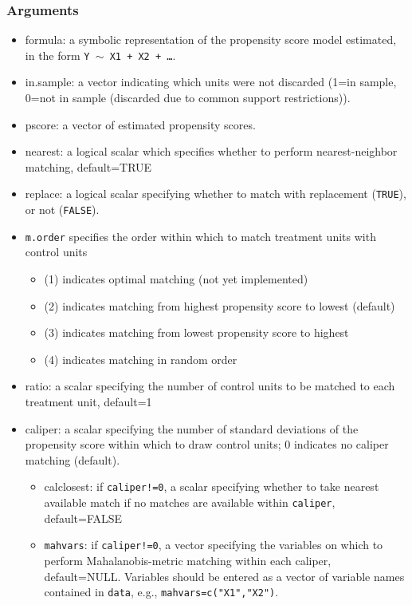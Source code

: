 \documentclass[oneside,letterpaper,titlepage]{article}
\begin{document}
\begin{appendix}
\subsubsection{Arguments}
\begin{itemize}
\item{formula}:  a symbolic representation of the propensity score model estimated, in the form {\tt Y $\sim$ X1 + X2 + \dots}.
\item{in.sample}: a vector indicating which units were not discarded (1=in sample, 0=not in sample (discarded due to common support restrictions)). 
\item{pscore}: a vector of estimated propensity scores. 
\item{nearest}: a logical scalar which specifies whether
  to perform nearest-neighbor matching, default=TRUE 
\item{replace}: a logical scalar specifying whether to match with
  replacement (\texttt{TRUE}), or not (\texttt{FALSE}). 
\item \texttt{m.order}  specifies the order within which to match
  treatment units with control units
  \begin{itemize}
  \item (1) indicates optimal matching (not yet implemented)
  \item (2) indicates matching from highest propensity score to
    lowest (default)
  \item (3) indicates matching from lowest propensity score to
    highest
  \item (4) indicates matching in random order
  \end{itemize}
\item{ratio}: a scalar specifying the number of control units to be matched to
  each treatment unit, default=1
\item{caliper}: a scalar specifying the number of standard deviations of 
  the propensity score within which to draw control units; 0 indicates
  no caliper matching (default).
  \begin{itemize}
  \item{calclosest}: if \texttt{caliper!=0}, a scalar specifying whether to take nearest
    available match if no matches are available within \texttt{caliper}, default=FALSE
  \item\texttt{mahvars}: if \texttt{caliper!=0}, a vector specifying
    the variables on which to perform Mahalanobis-metric matching
    within each caliper, default=NULL.  Variables should be entered as
    a vector of variable names contained in \texttt{data}, e.g., \texttt{mahvars=c("X1","X2")}.

\end{itemize}
\end{itemize}
\end{appendix}
\end{document}
